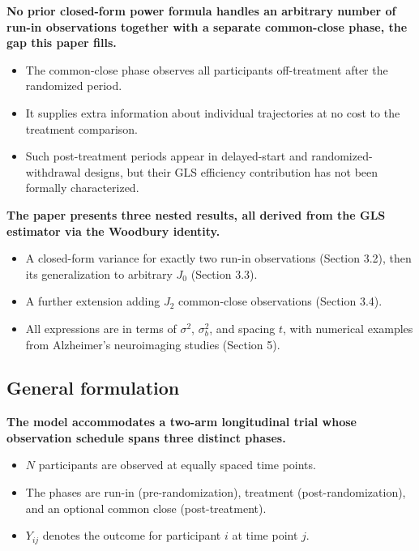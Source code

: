 \documentclass[
  11pt,
]{article}
\begin{document}
\textbf{No prior closed-form power formula handles an arbitrary number of run-in observations together with a separate common-close phase, the gap this paper fills.}

\begin{itemize}\setlength{\itemsep}{2pt}\setlength{\parskip}{0pt}
\item The common-close phase observes all participants off-treatment after the randomized period.
\item It supplies extra information about individual trajectories at no cost to the treatment comparison.
\item Such post-treatment periods appear in delayed-start and randomized-withdrawal designs, but their GLS efficiency contribution has not been formally characterized.
\end{itemize}

\textbf{The paper presents three nested results, all derived from the GLS estimator via the Woodbury identity.}

\begin{itemize}\setlength{\itemsep}{2pt}\setlength{\parskip}{0pt}
\item A closed-form variance for exactly two run-in observations (Section 3.2), then its generalization to arbitrary $J_0$ (Section 3.3).
\item A further extension adding $J_2$ common-close observations (Section 3.4).
\item All expressions are in terms of $\sigma^2$, $\sigma_b^2$, and spacing $t$, with numerical examples from Alzheimer's neuroimaging studies (Section 5).
\end{itemize}

\subsection{General formulation}\label{general-formulation}

\textbf{The model accommodates a two-arm longitudinal trial whose observation schedule spans three distinct phases.}

\begin{itemize}\setlength{\itemsep}{2pt}\setlength{\parskip}{0pt}
\item $N$ participants are observed at equally spaced time points.
\item The phases are run-in (pre-randomization), treatment (post-randomization), and an optional common close (post-treatment).
\item $Y_{ij}$ denotes the outcome for participant $i$ at time point $j$.
\end{itemize}
\end{document}
